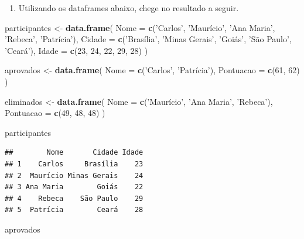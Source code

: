 \documentclass[]{book}
\newenvironment{Shaded}{\begin{snugshade}}{\end{snugshade}}
\newcommand{\KeywordTok}[1]{\textcolor[rgb]{0.13,0.29,0.53}{\textbf{#1}}}
\newcommand{\DataTypeTok}[1]{\textcolor[rgb]{0.13,0.29,0.53}{#1}}
\newcommand{\DecValTok}[1]{\textcolor[rgb]{0.00,0.00,0.81}{#1}}
\newcommand{\StringTok}[1]{\textcolor[rgb]{0.31,0.60,0.02}{#1}}
\newcommand{\NormalTok}[1]{#1}
\providecommand{\tightlist}{%
  \setlength{\itemsep}{0pt}\setlength{\parskip}{0pt}}
\begin{document}
\begin{enumerate}
\def\labelenumi{\arabic{enumi}.}
\setcounter{enumi}{1}
\tightlist
\item
  Utilizando os dataframes abaixo, chege no resultado a seguir.
\end{enumerate}

\begin{Shaded}
\begin{Highlighting}[]
\NormalTok{participantes <-}\StringTok{ }\KeywordTok{data.frame}\NormalTok{(}
  \DataTypeTok{Nome =} \KeywordTok{c}\NormalTok{(}\StringTok{'Carlos'}\NormalTok{, }\StringTok{'Maurício'}\NormalTok{, }\StringTok{'Ana Maria'}\NormalTok{, }\StringTok{'Rebeca'}\NormalTok{, }\StringTok{'Patrícia'}\NormalTok{),}
  \DataTypeTok{Cidade =} \KeywordTok{c}\NormalTok{(}\StringTok{'Brasília'}\NormalTok{, }\StringTok{'Minas Gerais'}\NormalTok{, }\StringTok{'Goiás'}\NormalTok{, }\StringTok{'São Paulo'}\NormalTok{, }\StringTok{'Ceará'}\NormalTok{),}
  \DataTypeTok{Idade =} \KeywordTok{c}\NormalTok{(}\DecValTok{23}\NormalTok{, }\DecValTok{24}\NormalTok{, }\DecValTok{22}\NormalTok{, }\DecValTok{29}\NormalTok{, }\DecValTok{28}\NormalTok{)}
\NormalTok{)}

\NormalTok{aprovados <-}\StringTok{ }\KeywordTok{data.frame}\NormalTok{(}
  \DataTypeTok{Nome =} \KeywordTok{c}\NormalTok{(}\StringTok{'Carlos'}\NormalTok{, }\StringTok{'Patrícia'}\NormalTok{),}
  \DataTypeTok{Pontuacao =} \KeywordTok{c}\NormalTok{(}\DecValTok{61}\NormalTok{, }\DecValTok{62}\NormalTok{)}
\NormalTok{)}

\NormalTok{eliminados <-}\StringTok{ }\KeywordTok{data.frame}\NormalTok{(}
  \DataTypeTok{Nome =} \KeywordTok{c}\NormalTok{(}\StringTok{'Maurício'}\NormalTok{, }\StringTok{'Ana Maria'}\NormalTok{, }\StringTok{'Rebeca'}\NormalTok{),}
  \DataTypeTok{Pontuacao =} \KeywordTok{c}\NormalTok{(}\DecValTok{49}\NormalTok{, }\DecValTok{48}\NormalTok{, }\DecValTok{48}\NormalTok{)}
\NormalTok{)}

\NormalTok{participantes}
\end{Highlighting}
\end{Shaded}

\begin{verbatim}
##        Nome       Cidade Idade
## 1    Carlos     Brasília    23
## 2  Maurício Minas Gerais    24
## 3 Ana Maria        Goiás    22
## 4    Rebeca    São Paulo    29
## 5  Patrícia        Ceará    28
\end{verbatim}

\begin{Shaded}
\begin{Highlighting}[]
\NormalTok{aprovados}
\end{Highlighting}
\end{Shaded}
\end{document}
